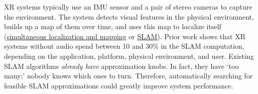 
XR systems typically use an IMU sensor and a pair of stereo cameras to capture the environment. The system detects visual features in the physical environment, builds up a map of them over time, and uses this map to localize itself (\underline{simultaneous localization and mapping} or \underline{SLAM}). Prior work shows that XR systems without audio spend between 10 and 30\% in the SLAM computation, depending on the application, platform, physical environment, and user\cite{huzaifa2020exploring}. Existing SLAM algorithms \textit{already have} approximation knobs. In fact, they have `too many;' nobody knows which ones to turn. Therefore, automatically searching for feasible SLAM approximations could greatly improve system performance.

